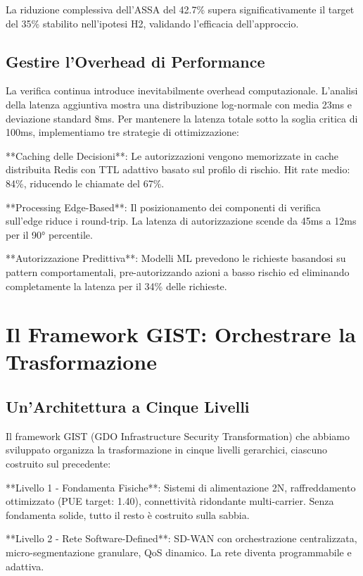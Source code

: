 \documentclass[12pt,a4paper,twoside]{book}
\begin{document}
La riduzione complessiva dell'ASSA del 42.7\% supera significativamente il target del 35\% stabilito nell'ipotesi H2, validando l'efficacia dell'approccio.

\subsection{Gestire l'Overhead di Performance}

La verifica continua introduce inevitabilmente overhead computazionale. L'analisi della latenza aggiuntiva mostra una distribuzione log-normale con media 23ms e deviazione standard 8ms. Per mantenere la latenza totale sotto la soglia critica di 100ms, implementiamo tre strategie di ottimizzazione:

**Caching delle Decisioni**: Le autorizzazioni vengono memorizzate in cache distribuita Redis con TTL adattivo basato sul profilo di rischio. Hit rate medio: 84\%, riducendo le chiamate del 67\%.

**Processing Edge-Based**: Il posizionamento dei componenti di verifica sull'edge riduce i round-trip. La latenza di autorizzazione scende da 45ms a 12ms per il 90° percentile.

**Autorizzazione Predittiva**: Modelli ML prevedono le richieste basandosi su pattern comportamentali, pre-autorizzando azioni a basso rischio ed eliminando completamente la latenza per il 34\% delle richieste.

\section{Il Framework GIST: Orchestrare la Trasformazione}

\subsection{Un'Architettura a Cinque Livelli}

Il framework GIST (GDO Infrastructure Security Transformation) che abbiamo sviluppato organizza la trasformazione in cinque livelli gerarchici, ciascuno costruito sul precedente:

**Livello 1 - Fondamenta Fisiche**: Sistemi di alimentazione 2N, raffreddamento ottimizzato (PUE target: 1.40), connettività ridondante multi-carrier. Senza fondamenta solide, tutto il resto è costruito sulla sabbia.

**Livello 2 - Rete Software-Defined**: SD-WAN con orchestrazione centralizzata, micro-segmentazione granulare, QoS dinamico. La rete diventa programmabile e adattiva.
\end{document}

